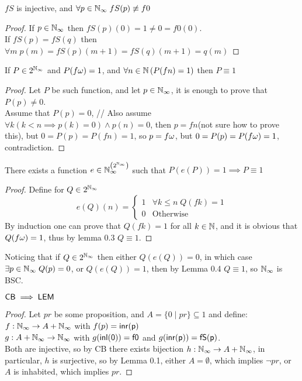 	\begin{lemma}
		$fS$ is injective, and $\forall p\in\mathbb{N}_\infty\;fS(p)\not\equiv f0$
	\end{lemma}
	\begin{proof}
		\hfill\break
		If $p\in\mathbb{N}_\infty$ then $fS(p)(0)=1\ne 0=f0(0)$.\\
		If $fS(p)=fS(q)$ then $\forall m\;p(m)=fS(p)(m+1)=fS(q)(m+1)=q(m)$
	\end{proof}
	\newpage
	\begin{lemma}
		If $P\in2^{\mathbb{N}_\infty}$ and $P(f\omega)=1$, and $\forall n\in\mathbb N\left(P(fn)=1\right)$ then $P\equiv 1$
	\end{lemma}
	\begin{proof}
		\hfill\break
		Let $P$ be such function, and let $p\in\mathbb{N}_\infty$, it is enough to prove that $P(p)\ne 0$.\\
		Assume that $P(p)=0$, //
		Also assume $\forall k\left(k<n\implies p(k)=0\right)\land p(n)=0$, then $p=fn$(not sure how to prove this), but $0=P(p)=P(fn)=1$, so $p=f\omega$, but $0=P(p)=P(f\omega)=1$, contradiction.
	\end{proof}
	\begin{lemma}
		There exists a function $e\in\mathbb{N}_\infty^{\left(2^{\mathbb{N}_\infty}\right)}$ such that $P(e(P))=1\implies P\equiv1$
	\end{lemma}
	\begin{proof}
		\hfill\break
		Define for $Q\in2^{\mathbb{N}_\infty}$ $$e(Q)(n)=\begin{cases}1&\forall k\le n\; Q(fk)=1\\0&\mbox{Otherwise}\end{cases}$$
		By induction one can prove that $Q(fk)=1$ for all $k\in\mathbb N$, and it is obvious that $Q(f\omega)=1$, thus by lemma 0.3 $Q\equiv 1$.
	\end{proof}
	
	Noticing that if $Q\in 2^{\mathbb{N}_\infty}$ then either $Q(e(Q))=0$, in which case $\exists p\in\mathbb{N}_\infty\; Q(p)=0$, or $Q(e(Q))=1$, then by Lemma 0.4 $Q\equiv 1$, so $\mathbb{N}_\infty$ is BSC.
	
	\begin{theorem}
		$\sf{CB}\implies\sf{LEM}$
	\end{theorem}
	\begin{proof}
		Let $pr$ be some proposition, and $A=\{0\mid pr\}\subseteq 1$ and define:\\
		$f:\mathbb{N}_\infty\to A+\mathbb{N}_\infty$ with $f(p)=\sf{inr}(p)$\\
		$g:A+\mathbb{N}_\infty\to\mathbb{N}_\infty$ with $g(\sf{inl}(0))=f0$ and $g(\sf{inr}(p))=fS(p)$.\\
		
		Both are injective, so by CB there exists bijection $h:\mathbb{N}_\infty\to A+\mathbb{N}_\infty$, in particular, $h$ is surjective, so by Lemma 0.1, either $A=\emptyset$, which implies $\lnot pr$, or $A$ is inhabited, which implies $pr$.
	\end{proof}

